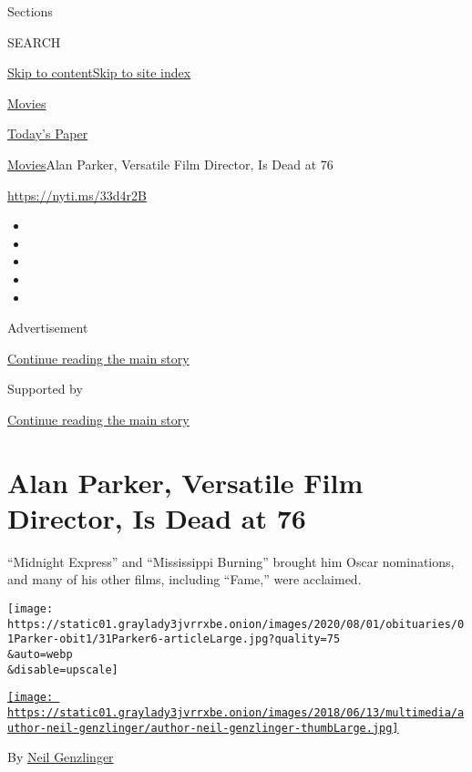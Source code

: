 Sections

SEARCH

\protect\hyperlink{site-content}{Skip to
content}\protect\hyperlink{site-index}{Skip to site index}

\href{https://www.nytimes3xbfgragh.onion/section/movies}{Movies}

\href{https://myaccount.nytimes3xbfgragh.onion/auth/login?response_type=cookie\&client_id=vi}{}

\href{https://www.nytimes3xbfgragh.onion/section/todayspaper}{Today's
Paper}

\href{/section/movies}{Movies}\textbar{}Alan Parker, Versatile Film
Director, Is Dead at 76

\url{https://nyti.ms/33d4r2B}

\begin{itemize}
\item
\item
\item
\item
\item
\end{itemize}

Advertisement

\protect\hyperlink{after-top}{Continue reading the main story}

Supported by

\protect\hyperlink{after-sponsor}{Continue reading the main story}

\hypertarget{alan-parker-versatile-film-director-is-dead-at-76}{%
\section{Alan Parker, Versatile Film Director, Is Dead at
76}\label{alan-parker-versatile-film-director-is-dead-at-76}}

``Midnight Express'' and ``Mississippi Burning'' brought him Oscar
nominations, and many of his other films, including ``Fame,'' were
acclaimed.

\texttt{[image: https://static01.graylady3jvrrxbe.onion/images/2020/08/01/obituaries/01Parker-obit1/31Parker6-articleLarge.jpg?quality=75\\\&auto=webp\\\&disable=upscale]}

\href{https://www.nytimes3xbfgragh.onion/by/neil-genzlinger}{\texttt{[image: https://static01.graylady3jvrrxbe.onion/images/2018/06/13/multimedia/author-neil-genzlinger/author-neil-genzlinger-thumbLarge.jpg]}}

By \href{https://www.nytimes3xbfgragh.onion/by/neil-genzlinger}{Neil
Genzlinger}

